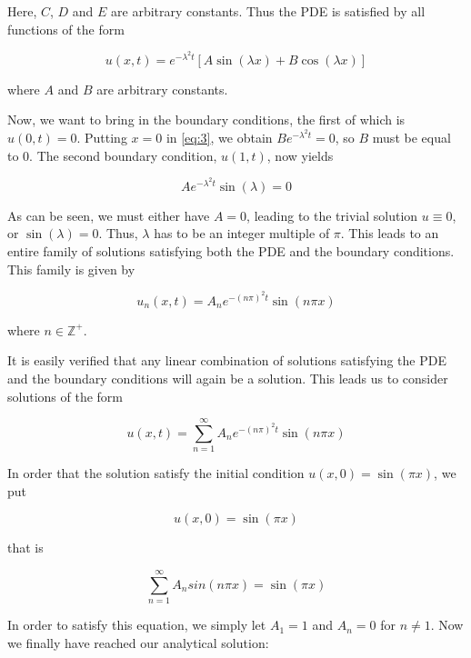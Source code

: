 \documentclass{article}
\begin{document}
Here, $C$, $D$ and $E$ are arbitrary constants. Thus the PDE is satisfied by all functions of the form

\begin{equation}
    u(x, t) = e^{-\lambda^2 t}[A \sin(\lambda x) + B \cos(\lambda x)]\label{eq:3}
\end{equation}

where $A$ and $B$ are arbitrary constants.

Now, we want to bring in the boundary conditions, the first of which is $u(0, t) = 0$. Putting $x=0$ in \eqref{eq:3}, we obtain $B e^{-\lambda^2 t} = 0$, so $B$ must be equal to 0. The second boundary condition, $u(1, t)$, now yields

\begin{equation}
    A e^{-\lambda^2 t} \sin(\lambda) = 0
\end{equation}

As can be seen, we must either have $A=0$, leading to the trivial solution $u\equiv 0$, or $\sin(\lambda) = 0$. Thus, $\lambda$ has to be an integer multiple of $\pi$. This leads to an entire family of solutions satisfying both the PDE and the boundary conditions. This family is given by

\begin{equation}
    u_n(x, t) = A_n e^{-(n \pi)^2 t} \sin(n \pi x)
\end{equation}

where $n \in \mathbb{Z}^{+}$.

It is easily verified that any linear combination of solutions satisfying the PDE and the boundary conditions will again be a solution. This leads us to consider solutions of the form

\begin{equation}
    u(x, t) = \sum_{n=1}^{\infty}{A_n e^{-(n \pi)^2 t} \sin(n \pi x)}
\end{equation}

In order that the solution satisfy the initial condition $u(x, 0) = \sin(\pi x)$, we put

\begin{equation}
    u(x, 0) = \sin(\pi x)
\end{equation}

that is

\begin{equation}
    \sum_{n=1}^{\infty}{A_n  sin(n \pi x)} = \sin(\pi x)
\end{equation}

In order to satisfy this equation, we simply let $A_1 = 1$ and $A_n = 0$ for $n \neq 1$. Now we finally have reached our analytical solution:
\end{document}
